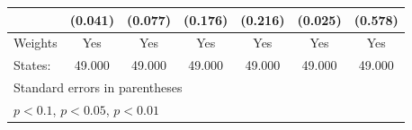{\begin{tabular}{l*{6}{c}}
            &     (0.041)         &     (0.077)         &     (0.176)         &     (0.216)         &     (0.025)         &     (0.578)         \\
\hline
Weights     &         Yes         &         Yes         &         Yes         &         Yes         &         Yes         &         Yes         \\
States:     &      49.000         &      49.000         &      49.000         &      49.000         &      49.000         &      49.000         \\
\hline\hline
\multicolumn{7}{l}{\footnotesize Standard errors in parentheses}\\
\multicolumn{7}{l}{\footnotesize \sym{*} \(p<0.1\), \sym{**} \(p<0.05\), \sym{***} \(p<0.01\)}\\
\end{tabular}
}
